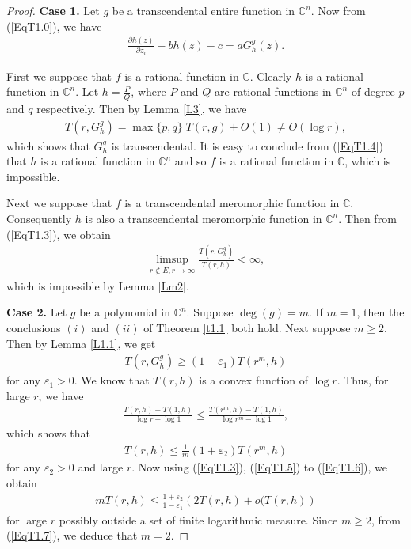\documentclass[10pt,a4paper]{amsart}
\begin{document}
\begin{proof}
\medskip
{\bf Case 1.} Let $g$ be a transcendental entire function in $\mathbb{C}^n$. Now from (\ref{EqT1.0}), we have 
\begin{align}\label{EqT1.4}
\frac{\partial h(z)}{\partial z_i}-bh(z)-c=aG^g_h(z).
\end{align}


\medskip
First we suppose that $f$ is a rational function in $\mathbb{C}$. Clearly $h$ is a rational function in $\mathbb{C}^n$. Let $h=\frac{P}{Q}$, where $P$ and $Q$ are rational functions in $\mathbb{C}^n$ of degree $p$ and $q$ respectively. Then by Lemma \ref{L3}, we have 
\begin{align*}
T(r, G^g_h)=\max\{p,q\}\;T(r,g)+O(1)\neq O(\log r),
\end{align*}
which shows that $G^g_h$ is transcendental. It is easy to conclude from (\ref{EqT1.4}) that $h$ is a rational function in $\mathbb{C}^n$ and so $f$ is a rational function in $\mathbb{C}$, which is impossible.


\medskip
Next we suppose that $f$ is a transcendental meromorphic function in $\mathbb{C}$. Consequently $h$ is also a transcendental meromorphic function in $\mathbb{C}^n$. Then from (\ref{EqT1.3}), we obtain 
\begin{align*}
\limsup\limits_{r\not\in E, r\to\infty}\frac{T\left(r,G^g_h\right)}{T(r,h)}<\infty,
\end{align*}
which is impossible by Lemma \ref{Lm2}.


\medskip
{\bf Case 2.} Let $g$ be a polynomial in $\mathbb{C}^n$. Suppose $\deg(g)=m$. If $m =1$, then
the conclusions $(i)$ and $(ii)$ of Theorem \ref{t1.1} both hold. Next suppose $m\geq 2$. Then by Lemma \ref{L1.1}, we get
\begin{align}\label{EqT1.5}
T\left(r,G^g_h\right)\geq (1-\varepsilon_1)T(r^m,h)
\end{align}
for any $\varepsilon_1>0$. We know that $T(r, h)$ is a convex function of $\log r$. Thus, for large $r$, we have 
\begin{align*}
\frac{T(r,h)-T(1,h)}{\log r-\log 1}\leq \frac{T(r^m,h)-T(1,h)}{\log r^m-\log 1},
\end{align*}
which shows that 
\begin{align}\label{EqT1.6}
T(r,h)\leq \frac{1}{m}(1+\varepsilon_2)T\left(r^m,h\right)
\end{align}
for any $\varepsilon_2>0$ and large $r$. Now using (\ref{EqT1.3}), (\ref{EqT1.5}) to (\ref{EqT1.6}), we obtain
\begin{align}\label{EqT1.7}
mT(r,h)\leq \frac{1+\varepsilon_2}{1-\varepsilon_1}\left(2T(r,h)+o(T(r,h)\right)
\end{align} 
for large $r$ possibly outside a set of finite logarithmic measure. Since $m\geq 2$,  from (\ref{EqT1.7}), we deduce that $m= 2$.


\end{proof}
\end{document}
